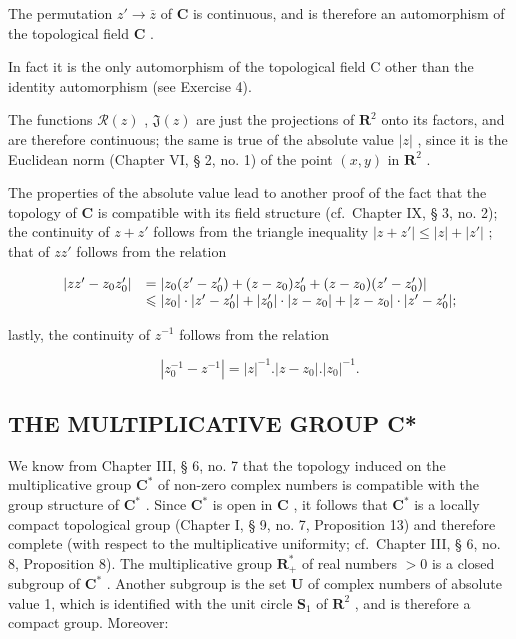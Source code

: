 The permutation \(z' \to \overline{z}\) of \(\mathbf{C}\) is continuous, and is therefore an automorphism of the topological field \(\mathbf{C}\) .

In fact it is the only automorphism of the topological field C other than the identity automorphism (see Exercise 4).

The functions \(\mathcal{R}(z)\) , \(\mathfrak{J}(z)\) are just the projections of \(\mathbf{R}^2\) onto its factors, and are therefore continuous; the same is true of the absolute value \(|z|\) , since it is the Euclidean norm (Chapter VI, § 2, no. 1) of the point \((x,y)\) in \(\mathbf{R}^2\) .

The properties of the absolute value lead to another proof of the fact that the topology of \(\mathbf{C}\) is compatible with its field structure (cf.~Chapter IX, § 3, no. 2); the continuity of \(z + z'\) follows from the triangle inequality \(|z + z'| \leqslant |z| + |z'|\) ; that of \(zz'\) follows from the relation

\[
\begin{array}{r l} | z z ^ {\prime} - z _ {0} z _ {0} ^ {\prime} | & = | z _ {0} (z ^ {\prime} - z _ {0} ^ {\prime}) + (z - z _ {0}) z _ {0} ^ {\prime} + (z - z _ {0}) (z ^ {\prime} - z _ {0} ^ {\prime}) | \\ & \leqslant | z _ {0} | \cdot | z ^ {\prime} - z _ {0} ^ {\prime} | + | z _ {0} ^ {\prime} | \cdot | z - z _ {0} | + | z - z _ {0} | \cdot | z ^ {\prime} - z _ {0} ^ {\prime} |; \end{array}
\]

lastly, the continuity of \(z^{-1}\) follows from the relation

\[
\left| z _ {0} ^ {- 1} - z ^ {- 1} \right| = | z | ^ {- 1}. \left| z - z _ {0} \right|. \left| z _ {0} \right| ^ {- 1}.
\]

\subsection{THE MULTIPLICATIVE GROUP C*}

We know from Chapter III, § 6, no. 7 that the topology induced on the multiplicative group \(\mathbf{C}^*\) of non-zero complex numbers is compatible with the group structure of \(\mathbf{C}^*\) . Since \(\mathbf{C}^*\) is open in \(\mathbf{C}\) , it follows that \(\mathbf{C}^*\) is a locally compact topological group (Chapter I, § 9, no. 7, Proposition 13) and therefore complete (with respect to the multiplicative uniformity; cf.~Chapter III, § 6, no. 8, Proposition 8). The multiplicative group \(\mathbf{R}_+^*\) of real numbers \(>0\) is a closed subgroup of \(\mathbf{C}^*\) . Another subgroup is the set \(\mathbf{U}\) of complex numbers of absolute value 1, which is identified with the unit circle \(\mathbf{S}_1\) of \(\mathbf{R}^2\) , and is therefore a compact group. Moreover:


